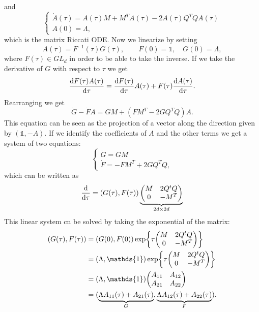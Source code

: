 and
\begin{equation*}
    \begin{cases}
        \dot{A}(\tau) = A(\tau)M + M^TA(\tau) - 2A(\tau)Q^TQA(\tau) \\
        A(0) = \Lambda,
    \end{cases}
\end{equation*}
which is the matrix Riccati ODE. Now we linearize by setting
\begin{equation*}
    A(\tau) = F^{-1}(\tau)G(\tau), \qquad F(0) = \mathds{1}, \quad G(0) = \Lambda,
\end{equation*}
where $F(\tau)\in GL_d$ in order to be able to take the inverse. If we take the derivative of $G$ with respect to $\tau$ we get
\begin{equation*}
    \dv{F(\tau)A(\tau)}{\tau} = \dv{F(\tau)}{\tau} A(\tau) + F(\tau)\dv{A(\tau)}{\tau}.
\end{equation*}
Rearranging we get
\begin{equation}
    \dot{G} - \dot{F}A = GM + (FM^T - 2GQ^TQ)A.
\end{equation}
This equation can be seen as the projection of a vector along the direction given by $(\mathds{1}, -A)$. If we identify the coefficients of $A$ and the other terms we get a system of two equations:
\begin{equation}
    \begin{cases}
        \dot{G} = GM \\
        \dot{F} = -FM^T + 2GQ^TQ,
    \end{cases}
\end{equation}
which can be written as
\begin{equation}
    \dv{}{\tau} (G(\tau), F(\tau)) = (G(\tau), F(\tau))\underbrace{\mqty(M & 2Q^tQ \\ 0 & -M^T)}_{2d\times 2d}
\end{equation}
This linear system cn be solved by taking the exponential of the matrix:
\begin{align}%
    \notag(G(\tau), F(\tau)) &= (G(0), F(0))\exp{\tau\mqty(M & 2Q^tQ \\ 0 & -M^T)} \\
    &=
    \notag(\Lambda, \mathds{1})\exp{\tau\mqty(M & 2Q^tQ \\ 0 & -M^T)} \\
    &=
    \notag(\Lambda, \mathds{1})\mqty(A_{11} & A_{12} \\ A_{21} & A_{22}) \\
    &=
    (\underbrace{\Lambda A_{11}(\tau) + A_{21}(\tau)}_{G}, \underbrace{\Lambda A_{12}(\tau) + A_{22}(\tau)}_{F}).
\end{align}
